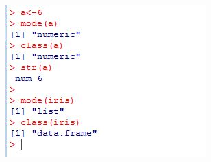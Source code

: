\documentclass{beamer}
\begin{document}
 	\begin{frame}
 		\begin{figure}
 			\centering
 			\includegraphics[width=0.9\linewidth]{images/modeclass}
 			
 		\end{figure}
 		
 		
 	\end{frame}
 	
\end{document}
